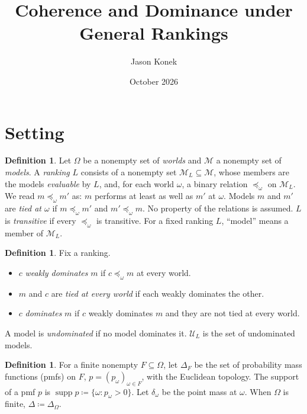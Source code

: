 \documentclass[11pt]{article}
\title{Coherence and Dominance under General Rankings}
\author{Jason Konek}
\date{October 2026}
\theoremstyle{definition}
\newtheorem{definition}[theorem]{Definition}
\newcommand{\M}{\mathcal M}
\newcommand{\U}{\mathcal U}
\newcommand{\supp}{\operatorname{supp}}
\begin{document}
\maketitle

\begin{abstract}
\end{abstract}

\section{Setting}\label{sec:setting}

\begin{definition}\label{def:rankings}
Let $\Omega$ be a nonempty set of \emph{worlds} and $\M$ a nonempty set of \emph{models}. A \emph{ranking} $L$ consists of a nonempty set $\M_L\subseteq\M$, whose members are the models \emph{evaluable} by $L$, and, for each world $\omega$, a binary relation $\preceq_\omega$ on $\M_L$. We read $m\preceq_\omega m'$ as: $m$ performs at least as well as $m'$ at $\omega$. Models $m$ and $m'$ are \emph{tied at $\omega$} if $m\preceq_\omega m'$ and $m'\preceq_\omega m$. No property of the relations is assumed. $L$ is \emph{transitive} if every $\preceq_\omega$ is transitive. For a fixed ranking $L$, ``model'' means a member of $\M_L$.
\end{definition}

\begin{definition}\label{def:dominance}
Fix a ranking.
\begin{itemize}[leftmargin=*]
\item $c$ \emph{weakly dominates} $m$ if $c\preceq_\omega m$ at every world.
\item $m$ and $c$ are \emph{tied at every world} if each weakly dominates the other.
\item $c$ \emph{dominates} $m$ if $c$ weakly dominates $m$ and they are not tied at every world.
\end{itemize}
A model is \emph{undominated} if no model dominates it. $\U_L$ is the set of undominated models.
\end{definition}

\begin{definition}\label{def:priors}
For a finite nonempty $F\subseteq\Omega$, let $\Delta_F$ be the set of probability mass functions (pmfs) on $F$, $p=(p_\omega)_{\omega\in F}$, with the Euclidean topology. The support of a pmf $p$ is $\supp p\coloneqq\{\omega:p_\omega>0\}$. Let $\delta_\omega$ be the point mass at $\omega$. When $\Omega$ is finite, $\Delta\coloneqq\Delta_\Omega$.
\end{definition}
\end{document}
